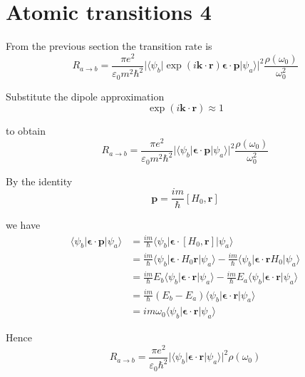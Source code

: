 

\section*{Atomic transitions 4}

From the previous section the transition rate is
\begin{equation*}
R_{a\rightarrow b}
=\frac{\pi e^2}{\varepsilon_0m^2\hbar^2}
\bigl|\langle\psi_b|\exp(i\mathbf k\cdot\mathbf r)\boldsymbol{\epsilon}\cdot\mathbf p|\psi_a\rangle\bigr|^2
\frac{\rho(\omega_0)}{\omega_0^2}
\end{equation*}

Substitute the dipole approximation
\begin{equation*}
\exp(i\mathbf k\cdot\mathbf r)\approx1
\end{equation*}

to obtain
\begin{equation*}
R_{a\rightarrow b}
=\frac{\pi e^2}{\varepsilon_0m^2\hbar^2}
\bigl|\langle\psi_b|\boldsymbol{\epsilon}\cdot\mathbf p|\psi_a\rangle\bigr|^2
\frac{\rho(\omega_0)}{\omega_0^2}
\end{equation*}

By the identity
\begin{equation*}
\mathbf p=\frac{im}{\hbar}[H_0,\mathbf r]
\tag{1}
\end{equation*}

we have
\begin{align*}
\langle\psi_b|\boldsymbol{\epsilon}\cdot\mathbf p|\psi_a\rangle
&=\frac{im}{\hbar}\langle\psi_b|\boldsymbol{\epsilon}\cdot[H_0,\mathbf r]|\psi_a\rangle
\\
&=\frac{im}{\hbar}\langle\psi_b|\boldsymbol{\epsilon}\cdot H_0\mathbf r|\psi_a\rangle
-\frac{im}{\hbar}\langle\psi_b|\boldsymbol{\epsilon}\cdot\mathbf rH_0|\psi_a\rangle
\\
&=\frac{im}{\hbar}E_b\langle\psi_b|\boldsymbol{\epsilon}\cdot\mathbf r|\psi_a\rangle
-\frac{im}{\hbar}E_a\langle\psi_b|\boldsymbol{\epsilon}\cdot\mathbf r|\psi_a\rangle
\\
&=\frac{im}{\hbar}(E_b-E_a)\langle\psi_b|\boldsymbol{\epsilon}\cdot\mathbf r|\psi_a\rangle
\\
&=im\omega_0\langle\psi_b|\boldsymbol{\epsilon}\cdot\mathbf r|\psi_a\rangle
\end{align*}

Hence
\begin{equation*}
R_{a\rightarrow b}
=\frac{\pi e^2}{\varepsilon_0\hbar^2}
\bigl|\langle\psi_b|\boldsymbol{\epsilon}\cdot\mathbf r|\psi_a\rangle\bigr|^2
\rho(\omega_0)
\end{equation*}

